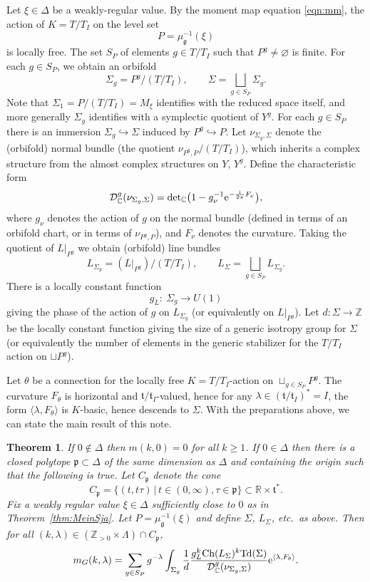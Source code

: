 \documentclass[11pt]{article}
\numberwithin{equation}{section}
\newtheorem{Theorem}{Theorem}[section]
\newcommand{\pair}[2]{\langle #1, #2 \rangle}
\newcommand{\tn}[1]{\textnormal{#1}}
\renewcommand{\i}{{\mathrm{i}}}
\def\g{\ensuremath{\mathfrak{g}}}
\def\t{\ensuremath{\mathfrak{t}}}
\def\p{\ensuremath{\mathfrak{p}}}
\def\bC{\ensuremath{\mathbb{C}}}
\def\bR{\ensuremath{\mathbb{R}}}
\def\bZ{\ensuremath{\mathbb{Z}}}
\def\Ch{\ensuremath{\textnormal{Ch}}}
\def\Td{\ensuremath{\textnormal{Td}}}
\def\calDC{\ensuremath{\mathcal{D}_{\bC}}}
\begin{document}
Let $\xi \in \Delta$ be a weakly-regular value. By the moment map equation \eqref{eqn:mm}, the action of $K=T/T_I$ on the level set
\[ P=\mu_\g^{-1}(\xi) \]
is locally free. The set $S_P$ of elements $g \in T/T_I$ such that $P^g\ne \varnothing$ is finite. For each $g \in S_P$, we obtain an orbifold
\[ \Sigma_g=P^g/(T/T_I), \qquad \Sigma=\bigsqcup_{g \in S_P} \Sigma_g.\]
Note that $\Sigma_1=P/(T/T_I)=M_\xi$ identifies with the reduced space itself, and more generally $\Sigma_g$ identifies with a symplectic quotient of $Y^g$. For each $g \in S_P$ there is an immersion $\Sigma_g\hookrightarrow \Sigma$ induced by $P^g\hookrightarrow P$. Let $\nu_{\Sigma_g,\Sigma}$ denote the (orbifold) normal bundle (the quotient $\nu_{P^g,P}/(T/T_I)$), which inherits a complex structure from the almost complex structures on $Y$, $Y^g$. Define the characteristic form
\[ \calDC^g(\nu_{\Sigma_g,\Sigma})=\tn{det}_\bC\big(1-g_\nu^{-1} {\rm e}^{-\frac{\i}{2\pi}F_\nu}\big), \]
where $g_\nu$ denotes the action of $g$ on the normal bundle (defined in terms of an orbifold chart, or in terms of $\nu_{P^g,P}$), and $F_\nu$ denotes the curvature. Taking the quotient of $L|_{P^g}$ we obtain (orbifold) line bundles
\[ L_{\Sigma_g}=(L|_{P^g})/(T/T_I), \qquad L_\Sigma=\bigsqcup_{g \in S_P} L_{\Sigma_g}. \]
There is a locally constant function
\[ g_L \colon \ \Sigma_g \rightarrow U(1) \]
giving the phase of the action of $g$ on $L_{\Sigma_g}$ (or equivalently on $L|_{P^g}$). Let $d \colon \Sigma \rightarrow \bZ$ be the locally constant function giving the size of a generic isotropy group for $\Sigma$ (or equivalently the number of elements in the generic stabilizer for the $T/T_I$ action on $\sqcup P^g$).

Let $\theta$ be a connection for the locally free $K=T/T_I$-action on $\sqcup_{g \in S_P}P^g$. The curvature $F_\theta$ is horizontal and $\t/\t_I$-valued, hence for any $\lambda \in (\t/\t_I)^\ast=I$, the form $\pair{\lambda}{F_\theta}$ is $K$-basic, hence descends to $\Sigma$. With the preparations above, we can state the main result of this note.
\begin{Theorem}\label{thm:main}If $0 \notin \Delta$ then $m(k,0)=0$ for all $k \ge 1$. If $0 \in \Delta$ then there is a closed polytope $\p \subset \Delta$ of the same dimension as $\Delta$ and containing the origin such that the following is true. Let $C_\p$ denote the cone
\[ C_\p=\{(t,t\tau)\,|\,t \in (0,\infty), \tau \in \p \} \subset \bR \times \t^\ast.\]
Fix a weakly regular value $\xi \in \Delta$ sufficiently close to $0$ as in Theorem~{\rm \ref{thm:MeinSja}}. Let $P=\mu_\g^{-1}(\xi)$ and define $\Sigma$, $L_\Sigma$, etc.\ as above. Then for all $(k,\lambda) \in (\bZ_{>0}\times \Lambda)\cap C_\p$,
\begin{gather}\label{eqn:main}
m_G(k,\lambda)=\sum_{g \in S_P} g^{-\lambda} \int_{\Sigma_g} \frac{1}{d}\frac{g_L^k\Ch(L_\Sigma)^k\Td(\Sigma)}{\calDC^g(\nu_{\Sigma_g,\Sigma})}{\rm e}^{\pair{\lambda}{F_\theta}}.
\end{gather}
\end{Theorem}
\end{document}
